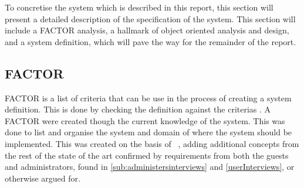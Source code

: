 To concretise the system which is described in this report, this section will present a detailed description of the specification of the system. This section will include a FACTOR analysis, a hallmark of object oriented analysis and design, and a system definition, which will pave the way for the remainder of the report.

\subsection{FACTOR}
\label{FACTOR}
FACTOR is a list of criteria that can be use in the process of creating a system definition. This is done by checking the definition against the criterias \cite{mathiassen2001objektorienteret}. A FACTOR were created though the current knowledge of the system. This was done to list and organise the system and domain of where the system should be implemented.
This was created on the basis of ~\cite{sorensen2012}, adding additional concepts from the rest of the state of the art confirmed by requirements from both the guests and administrators, found in \cref{sub:administersinterviews} and \cref{userInterviews}, or otherwise argued for.

